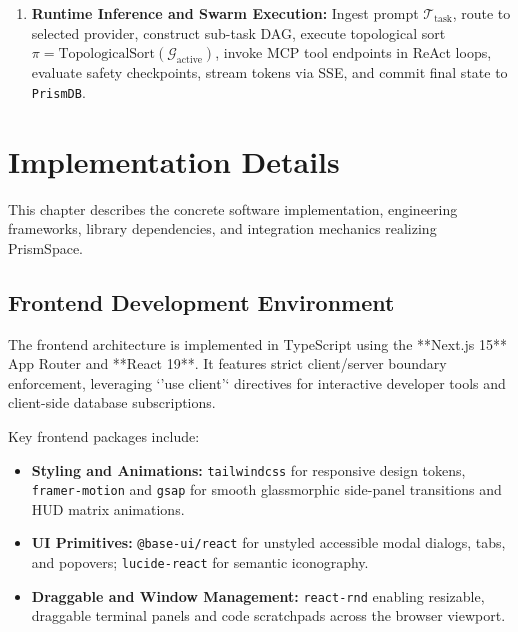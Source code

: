 \documentclass[12pt,a4paper]{report}
\begin{document}
\begin{enumerate}
    \begin{equation}
        \mathcal{L}_{\mathrm{ORPO}} = \mathcal{L}_{\mathrm{SFT}} - \beta \log \sigma \left( \log \left[ \frac{P(y_w \mid x)/(1 - P(y_w \mid x))}{P(y_l \mid x)/(1 - P(y_l \mid x))} \right] \right)
    \end{equation}
    \item \textbf{Runtime Inference and Swarm Execution:} Ingest prompt $\mathcal{T}_{\text{task}}$, route to selected provider, construct sub-task DAG, execute topological sort $\pi = \mathrm{TopologicalSort}(\mathcal{G}_{\text{active}})$, invoke MCP tool endpoints in ReAct loops, evaluate safety checkpoints, stream tokens via SSE, and commit final state to \texttt{PrismDB}.
\end{enumerate}


\chapter{Implementation Details}

This chapter describes the concrete software implementation, engineering frameworks, library dependencies, and integration mechanics realizing PrismSpace.

\section{Frontend Development Environment}
The frontend architecture is implemented in TypeScript using the **Next.js 15** App Router and **React 19**. It features strict client/server boundary enforcement, leveraging `'use client'` directives for interactive developer tools and client-side database subscriptions.

Key frontend packages include:
\begin{itemize}
    \item \textbf{Styling and Animations:} \texttt{tailwindcss} for responsive design tokens, \texttt{framer-motion} and \texttt{gsap} for smooth glassmorphic side-panel transitions and HUD matrix animations.
    \item \textbf{UI Primitives:} \texttt{@base-ui/react} for unstyled accessible modal dialogs, tabs, and popovers; \texttt{lucide-react} for semantic iconography.
    \item \textbf{Draggable and Window Management:} \texttt{react-rnd} enabling resizable, draggable terminal panels and code scratchpads across the browser viewport.
\end{itemize}
\end{document}
